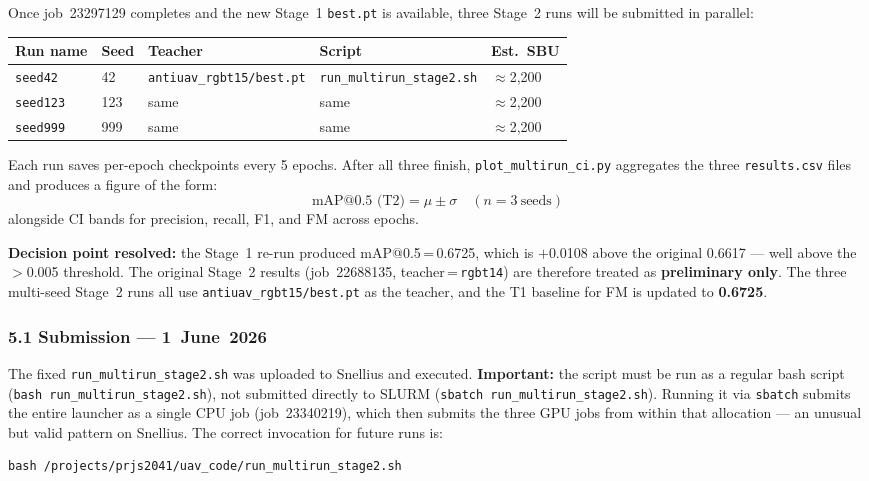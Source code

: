 Once job~23297129 completes and the new Stage~1 \texttt{best.pt}
is available, three Stage~2 runs will be submitted in parallel:

\begin{center}\small
\begin{tabular}{lllll}
\hline
\textbf{Run name} & \textbf{Seed} & \textbf{Teacher} & \textbf{Script} & \textbf{Est.\ SBU} \\
\hline
\texttt{seed42}  & 42  & \texttt{antiuav\_rgbt15/best.pt} & \texttt{run\_multirun\_stage2.sh} & $\approx$2,200 \\
\texttt{seed123} & 123 & same                              & same                              & $\approx$2,200 \\
\texttt{seed999} & 999 & same                              & same                              & $\approx$2,200 \\
\hline
\end{tabular}
\end{center}

\noindent Each run saves per-epoch checkpoints every 5 epochs.
After all three finish, \texttt{plot\_multirun\_ci.py} aggregates
the three \texttt{results.csv} files and produces a figure of the
form:
\[
    \text{mAP@0.5 (T2)} = \mu \pm \sigma \quad (n = 3\ \text{seeds})
\]
alongside CI bands for precision, recall, F1, and FM across epochs.

\noindent \textbf{Decision point resolved:} the Stage~1 re-run
produced mAP@0.5\,=\,0.6725, which is $+$0.0108 above the original
0.6617 --- well above the $>$0.005 threshold. The original Stage~2
results (job~22688135, teacher\,=\,\texttt{rgbt14}) are therefore
treated as \textbf{preliminary only}. The three multi-seed Stage~2
runs all use \texttt{antiuav\_rgbt15/best.pt} as the teacher,
and the T1 baseline for FM is updated to \textbf{0.6725}.

\subsubsection*{5.1 Submission — 1~June~2026}

The fixed \texttt{run\_multirun\_stage2.sh} was uploaded to Snellius
and executed. \textbf{Important:} the script must be run as a regular
bash script (\texttt{bash run\_multirun\_stage2.sh}), not submitted
directly to SLURM (\texttt{sbatch run\_multirun\_stage2.sh}).
Running it via \texttt{sbatch} submits the entire launcher as a single
CPU job (job~23340219), which then submits the three GPU jobs from
within that allocation — an unusual but valid pattern on Snellius.
The correct invocation for future runs is:
\begin{verbatim}
bash /projects/prjs2041/uav_code/run_multirun_stage2.sh
\end{verbatim}

